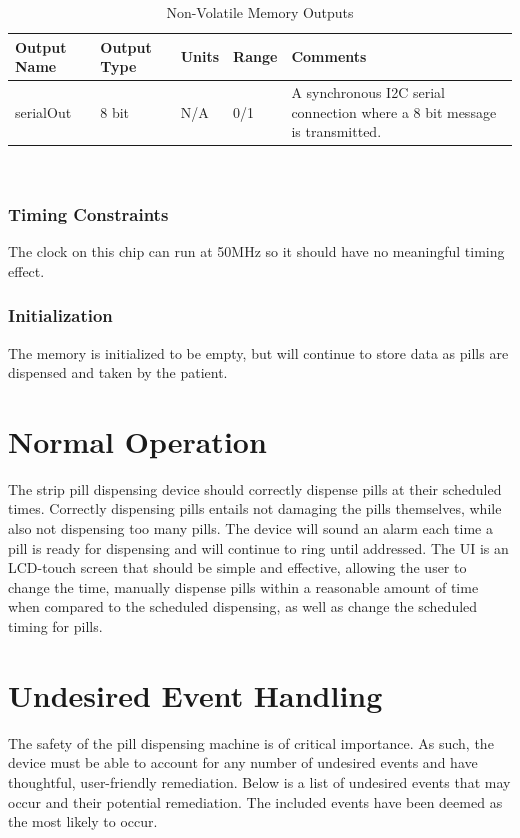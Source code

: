 \documentclass[12pt,titlepage]{article}
\begin{document}
\begin{table}[ht!]
\begin{center}
\begin{adjustbox}{max width=\textwidth}
\small
\begin{tabular}{|p{}|p{}|p{}|p{}|p{}|}
 \hline
 \textbf{Output Name} & \textbf{Output Type} & \textbf{Units} &\textbf{Range} & \textbf{Comments} \\
 \hline 
 serialOut & 8 bit  & N/A & 0/1 & A synchronous I2C serial connection where a 8 bit message is transmitted. \\
 \hline
\end{tabular}
\end{adjustbox}
\end{center}
\caption{Non-Volatile Memory  Outputs}
\end{table}
$ $\\
\subsubsection*{Timing Constraints}
The clock on this chip can run at 50MHz so it should have no meaningful timing effect.
\subsubsection*{Initialization}
The memory is initialized to be empty, but will continue to store data as pills are dispensed and taken by the patient.

\section{Normal Operation}
The strip pill dispensing device should correctly dispense pills at their scheduled times. Correctly dispensing pills entails not damaging the pills themselves, while also not dispensing too many pills. The device will sound an alarm each time a pill is ready for dispensing and will continue to ring until addressed. The UI is an LCD-touch screen that should be simple and effective, allowing the user to change the time, manually dispense pills within a reasonable amount of time when compared to the scheduled dispensing, as well as change the scheduled timing for pills.
\section{Undesired Event Handling}
The safety of the pill dispensing machine is of critical importance. As such, the device must be able to account for any number of undesired events and have thoughtful, user-friendly remediation. Below is a list of undesired events that may occur and their potential remediation. The included events have been deemed as the most likely to occur.
\end{document}
